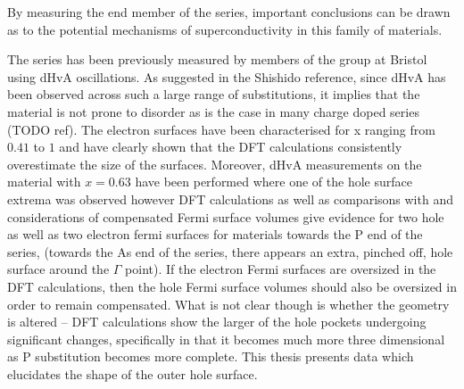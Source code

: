 By measuring the end member of the series, important conclusions can be drawn as to the potential mechanisms of superconductivity in this family of materials.

The \BaFePAs series has been previously measured by members of the group at Bristol using dHvA oscillations\cite{Shishido2010}. As suggested in the Shishido reference, since dHvA has been observed across such a large range of substitutions, it implies that the material is not prone to disorder as is the case in many charge doped series (TODO ref). The electron surfaces have been characterised for x ranging from $0.41$ to $1$ and have clearly shown that the DFT calculations consistently overestimate the size of the surfaces. Moreover, dHvA measurements on the material with $x=0.63$ have been performed where one of the hole surface extrema was observed\cite{Analytis2010c} however DFT calculations as well as comparisons with \SrFeP\cite{Analytis2009} and considerations of compensated Fermi surface volumes give evidence for two hole as well as two electron fermi surfaces for materials towards the P end of the series, (towards the As end of the series, there appears an extra, pinched off, hole surface around the $\Gamma$ point). If the electron Fermi surfaces are oversized in the DFT calculations, then the hole Fermi surface volumes should also be oversized in order to remain compensated. What is not clear though is whether the geometry is altered -- DFT calculations show the larger of the hole pockets undergoing significant changes, specifically in that it becomes much more three dimensional as P substitution becomes more complete. This thesis presents data which elucidates the shape of the outer hole surface.

